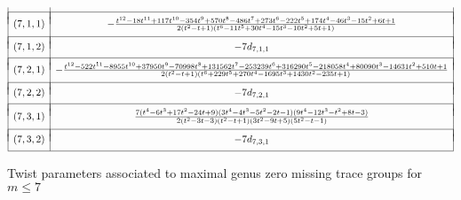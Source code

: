 \begin{table}[!ht]
\[\begin{array}{|c|c|}
& \\ [-.75em]
\hline
& \\ [-.75em]
(7,1,1) & - \frac{t^{12} - 18t^{11} + 117t^{10} - 354t^9 + 570t^8 - 486t^7 + 273t^6 - 222t^5 + 174t^4 - 46t^3 - 15t^2 + 6t + 1}{2(t^2 - t + 1)(t^6 - 11t^5 + 30t^4 - 15t^3 - 10t^2 + 5t + 1)}  \\
& \\ [-.75em]
\hline
& \\ [-.75em]
(7,1,2) &  -7 d_{7,1,1} \\
& \\ [-.75em]
\hline
& \\ [-.75em]
(7,2,1) & - \frac{t^{12} - 522t^{11} - 8955t^{10} + 37950t^9 - 70998t^8 + 131562t^7 - 253239t^6 + 316290t^5 - 218058t^4 + 80090t^3 - 14631t^2 + 510t + 1}{2(t^2 - t + 1)(t^6 + 229t^5 + 270t^4 - 1695t^3 + 1430t^2 - 235t + 1)} \\
& \\ [-.75em]
\hline
& \\ [-.75em]
(7,2,2) & -7 d_{7,2,1} \\
& \\ [-.75em]
\hline
& \\ [-.75em]
(7,3,1) & \frac{7(t^4 - 6t^3 + 17t^2 - 24t + 9)(3t^4 - 4t^3 - 5t^2 - 2t - 1)(9t^4 - 12t^3 - t^2 + 8t - 3)}{2(t^2 - 3t - 3)(t^2 - t + 1)(3t^2 - 9t + 5)(5t^2 - t - 1)} \\
& \\ [-.75em]
\hline
& \\ [-.75em]
(7,3,2) & -7d_{7,3,1} \\[.5em]
\hline 
\end{array}
\]


\vspace{.1in}
\caption{ Twist parameters associated to maximal genus zero missing trace groups for $m \leq 7$}
\label{masterlistoftwistparameters}
\end{table}

